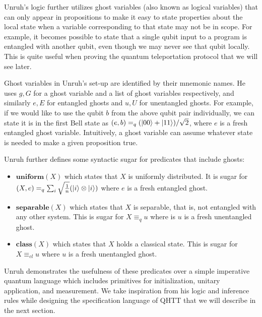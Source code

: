 \documentclass[adraft,creativecommons]{eptcs}
\theoremstyle{definition}
\theoremstyle{remark}
\begin{document}
Unruh's logic further utilizes ghost variables (also known as logical variables) that can only appear in propositions to make it easy to state properties about the local state when a variable corresponding to that state may not be in scope. For example, it becomes possible to state that a single qubit input to a program is entangled with another qubit, even though we may never see that qubit locally. This is quite useful when proving the quantum teleportation protocol that we will see later.

Ghost variables in Unruh's set-up are identified by their mnemonic names. He uses $g, G$ for a ghost variable and a list of ghost variables respectively, and similarly $e, E$ for entangled ghosts and $u, U$ for unentangled ghosts. For example, if we would like to use the qubit $b$ from the above qubit pair individually, we can state it is in the first Bell state as $(e, b) =_q (\ket{00}+\ket{11})/\sqrt{2}$, where $e$ is a fresh entangled ghost variable. Intuitively, a ghost variable can assume whatever state is needed to make a given proposition true.

Unruh further defines some syntactic sugar for predicates that include ghosts:

\begin{itemize}
    \item $\mathbf{uniform}(X)$ which states that $X$ is uniformly distributed. It is sugar for $(X, e) =_q \sum_i  \sqrt{\frac{1}{n}} (\ket{i} \otimes \ket{i})$ where $e$ is a fresh entangled ghost.
	\item $\mathbf{separable}(X)$ which states that $X$ is separable, that is, not entangled with any other system. This is sugar for $X \equiv_q u$ where is $u$ is a fresh unentangled ghost.
	\item $\mathbf{class}(X)$ which states that $X$ holds a classical state. This is sugar for $X \equiv_{cl} u$ where $u$ is a fresh unentangled ghost.
\end{itemize}

Unruh demonstrates the usefulness of these predicates over a simple imperative quantum language which includes primitives for initialization, unitary application, and measurement. We take inspiration from his logic and inference rules while designing the specification language of QHTT that we will describe in the next section.
\end{document}
